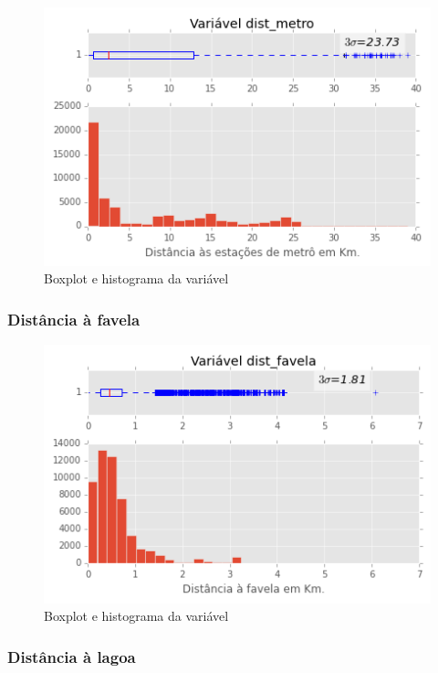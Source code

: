\begin{figure}[H]
	\centering
	\includegraphics[width=0.8\linewidth]{img/var_dist_metro_boxhist}
	\caption{Boxplot e histograma da variável }
	\label{fig:var_dist_metro_boxhist}
\end{figure} 

\subsubsection{Distância à favela}

\begin{figure}[H]
	\centering
	\includegraphics[width=0.8\linewidth]{img/var_dist_favela_boxhist}
	\caption{Boxplot e histograma da variável }
	\label{fig:var_dist_favela_boxhist}
\end{figure} 

\subsubsection{Distância à lagoa}

